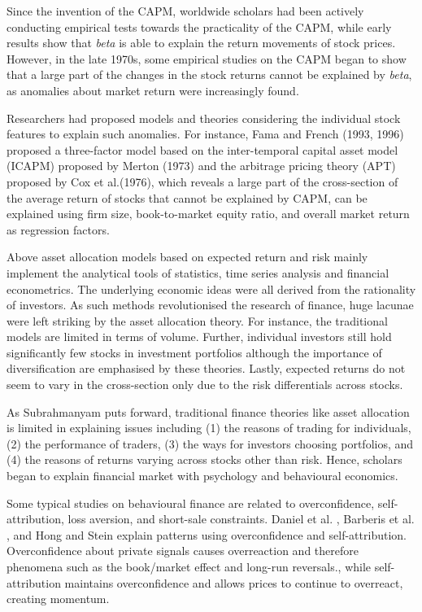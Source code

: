 Since the invention of the CAPM, worldwide scholars had been actively conducting empirical tests towards the practicality of the CAPM, while early results show that \textit{beta} is able to explain the return movements of stock prices. However, in the late 1970s, some empirical studies on the CAPM began to show that a large part of the changes in the stock returns cannot be explained by \textit{beta}, as anomalies about market return were increasingly found.

Researchers had proposed models and theories considering the individual stock features to explain such anomalies. For instance, Fama and French (1993, 1996) proposed a three-factor model based on the inter-temporal capital asset model (ICAPM) \cite{intertemporal} proposed by Merton (1973) and the arbitrage pricing theory (APT)~\cite{options} proposed by Cox et al.(1976), which reveals a large part of the cross-section of the average return of stocks that cannot be explained by CAPM, can be explained using firm size, book-to-market equity ratio, and overall market return~\cite{riskfactors, anomalies} as regression factors.

Above asset allocation models based on expected return and risk mainly implement the analytical tools of statistics, time series analysis and financial econometrics. The underlying economic ideas were all derived from the rationality of investors. As such methods revolutionised the research of finance, huge lacunae were left striking by the asset allocation theory. For instance, the traditional models are limited in terms of volume. Further, individual investors still hold significantly few stocks in investment portfolios although the importance of diversification are emphasised by these theories. Lastly, expected returns do not seem to vary in the cross-section only due to the risk differentials across stocks.

As Subrahmanyam \cite{subrahmanyam2008behavioural} puts forward, traditional finance theories like asset allocation is limited in explaining issues including (1) the reasons of trading for individuals, (2) the performance of traders, (3) the ways for investors choosing portfolios, and (4) the reasons of returns varying across stocks other than risk. Hence, scholars began to explain financial market with psychology and behavioural economics.

Some typical studies on behavioural finance are related to overconfidence, self-attribution, loss aversion, and short-sale constraints. Daniel et al. \cite{daniel1998investor, daniel2001overconfidence}, Barberis et al. \cite{barberis1998model}, and Hong and Stein \cite{hong1999unified} explain patterns using overconfidence and self-attribution. Overconfidence about private signals causes overreaction and therefore phenomena such as the book/market effect and long-run reversals., while self-attribution maintains overconfidence and allows prices to continue to overreact, creating momentum.


